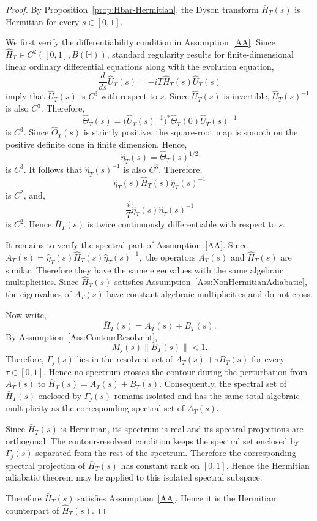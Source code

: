 \documentclass[pdflatex,sn-mathphys-num]{sn-jnl}
\theoremstyle{thmstyleone}
\theoremstyle{thmstyletwo}
\theoremstyle{thmstylethree}
\begin{document}
\begin{proof}
By Proposition~\ref{prop:Hbar-Hermitian}, the Dyson transform \(\bar H_T(s)\) is
Hermitian for every \(s\in[0,1]\).

We first verify the differentiability condition in Assumption~\ref{AA}. Since
\(\hat H_T\in C^2([0,1],B(\mathbb H))\), standard regularity results for
finite-dimensional linear ordinary differential equations along with the evolution equation,
\[
\frac{d}{ds}\hat U_T(s)=-iT\hat H_T(s)\hat U_T(s)
\]
imply that \(\hat U_T(s)\) is \(C^3\) with respect to \(s\). Since
\(\hat U_T(s)\) is invertible, \(\hat U_T(s)^{-1}\) is also \(C^3\). Therefore,
\[
\hat\Theta_T(s)
=
\bigl(\hat U_T(s)^{-1}\bigr)^*
\hat\Theta_T(0)
\hat U_T(s)^{-1}
\]
is \(C^3\). Since \(\hat\Theta_T(s)\) is strictly positive, the square-root map
is smooth on the positive definite cone in finite dimension. Hence,
\[
\hat\eta_T(s)=\hat\Theta_T(s)^{1/2}
\]
is \(C^3\). It follows that \(\hat\eta_T(s)^{-1}\) is also \(C^3\). Therefore,
\[
\hat\eta_T(s)\hat H_T(s)\hat\eta_T(s)^{-1}
\]
is \(C^2\), and,
\[
\frac{i}{T}\dot{\hat\eta}_T(s)\hat\eta_T(s)^{-1}
\]
is \(C^2\). Hence \(\bar H_T(s)\) is twice continuously differentiable with
respect to \(s\).

It remains to verify the spectral part of Assumption~\ref{AA}. Since
\(
A_T(s)=\hat\eta_T(s)\hat H_T(s)\hat\eta_T(s)^{-1},
\)
the operators \(A_T(s)\) and \(\hat H_T(s)\) are similar. Therefore they have
the same eigenvalues with the same algebraic multiplicities. Since
\(\hat H_T(s)\) satisfies Assumption~\ref{Ass:NonHermitianAdiabatic}, the
eigenvalues of \(A_T(s)\) have constant algebraic multiplicities and do
not cross.

Now write,
\[
\bar H_T(s)=A_T(s)+B_T(s).
\]
By Assumption~\ref{Ass:ContourResolvent},
\[
M_j(s)\|B_T(s)\|<1.
\]
Therefore, \(\Gamma_j(s)\) lies in the resolvent set of
\(A_T(s)+\tau B_T(s)\) for every \(\tau\in[0,1]\). Hence no spectrum crosses the
contour during the perturbation from \(A_T(s)\) to
\(\bar H_T(s)=A_T(s)+B_T(s)\). Consequently, the spectral set of
\(\bar H_T(s)\) enclosed by \(\Gamma_j(s)\) remains isolated and has the same
total algebraic multiplicity as the corresponding spectral set of \(A_T(s)\).

Since \(\bar H_T(s)\) is Hermitian, its spectrum is real and its spectral
projections are orthogonal. The contour-resolvent condition keeps the spectral
set enclosed by \(\Gamma_j(s)\) separated from the rest of the spectrum.
Therefore the corresponding spectral projection of \(\bar H_T(s)\) has constant
rank on \([0,1]\). Hence the Hermitian adiabatic theorem may be applied to this
isolated spectral subspace.

Therefore \(\bar H_T(s)\) satisfies Assumption~\ref{AA}. Hence it is the
Hermitian counterpart of \(\hat H_T(s)\).
\end{proof}
\end{document}
